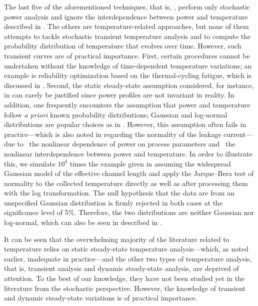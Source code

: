 The last five of the aforementioned techniques, that is, \cite{bhardwaj2006,
vrudhula2006, ghanta2006, bhardwaj2008, shen2009}, perform only stochastic power
analysis and ignore the interdependence between power and temperature described
in . The others are temperature-related approaches, but none
of them attempts to tackle stochastic transient temperature analysis and to
compute the probability distribution of temperature that evolves over time.
However, such transient curves are of practical importance. First, certain
procedures cannot be undertaken without the knowledge of time-dependent
temperature variations; an example is reliability optimization based on the
thermal-cycling fatigue, which is discussed in
. Second, the static steady-state assumption
considered, for instance, in \cite{huang2009a, juan2011, juan2012, lee2013} can
rarely be justified since power profiles are not invariant in reality. In
addition, one frequently encounters the assumption that power and temperature
follow \emph{a priori} known probability distributions; Gaussian and log-normal
distributions are popular choices as in \cite{bhardwaj2006, srivastava2010,
juan2012}. However, this assumption often fails in practice---which is also
noted in \cite{juan2012} regarding the normality of the leakage current---due to
\one~the nonlinear dependence of power on process parameters and \two~the
nonlinear interdependence between power and temperature. In order to illustrate
this, we simulate $10^4$ times the example given in 
assuming the widespread Gaussian model of the effective channel length and apply
the Jarque--Bera test of normality to the collected temperature directly as well
as after processing them with the log transformation. The null hypothesis that
the data are from an unspecified Gaussian distribution is firmly rejected in
both cases at the significance level of 5\%. Therefore, the two distributions
are neither Gaussian nor log-normal, which can also be seen in
 described in .

It can be seen that the overwhelming majority of the literature related to
temperature relies on static steady-state temperature analysis---which, as noted
earlier, inadequate in practice---and the other two types of temperature
analysis, that is, transient analysis and dynamic steady-state analysis, are
deprived of attention. To the best of our knowledge, they have not been studied
yet in the literature from the stochastic perspective. However, the knowledge of
transient and dynamic steady-state variations is of practical importance.

